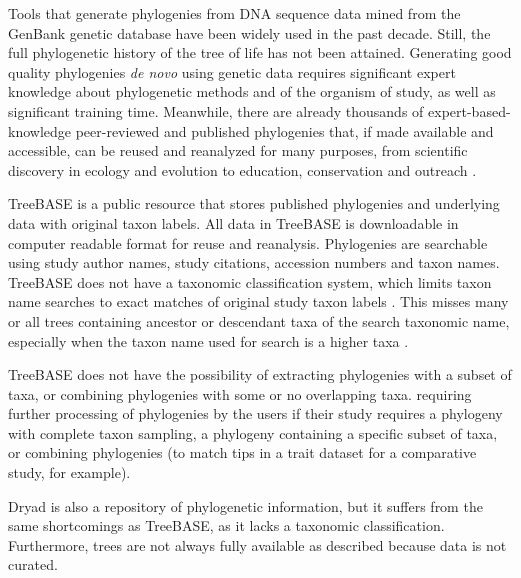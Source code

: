 \documentclass[oupdraft]{sysbio_sse}
\begin{document}
Tools that generate phylogenies from DNA sequence data mined from the GenBank genetic
database \citep{smith2009mega, sanderson2008phylota, antonelli2014supersmart}
have been widely used in the past decade. Still, the full phylogenetic history of the
tree of life has not been attained.
Generating good quality phylogenies \textit{de novo} using genetic data requires
significant expert knowledge about phylogenetic methods and of
the organism of study, as well as significant training time. Meanwhile, there are
already thousands of expert-based-knowledge peer-reviewed and published phylogenies
that, if made available and accessible, can be reused and reanalyzed for many purposes,
from scientific discovery in ecology and evolution to education, conservation and
outreach \citep{stoltzfus2013phylotastic, mctavish_phylesystem_2015, li2019common}.

TreeBASE \citep{piel2000treebase} is a public resource that stores published
phylogenies and underlying data with original taxon labels.
All data in TreeBASE is downloadable in computer readable format for reuse and reanalysis.
Phylogenies are searchable using study author names, study citations, accession numbers and taxon names.
TreeBASE does not have a taxonomic classification system, which limits
taxon name searches to exact matches of original study taxon labels \citep{anwar2009improved}.
This misses many or all trees containing ancestor or descendant taxa of the search taxonomic
name, especially when the taxon name used for search is a higher taxa \citep{chen2008phylofinder}.


TreeBASE does not have the possibility of extracting phylogenies with a
subset of taxa, or combining phylogenies with some or no overlapping taxa.
requiring further processing of phylogenies by the users if their study requires a phylogeny
with complete taxon sampling, a phylogeny containing a specific subset of taxa,
 or combining phylogenies (to match tips in a trait dataset for a comparative study, for example).

Dryad is also a repository of phylogenetic information, but it suffers from
the same shortcomings as TreeBASE, as it lacks a taxonomic classification.
Furthermore, trees are not always fully available as described because data is not curated.
\end{document}
